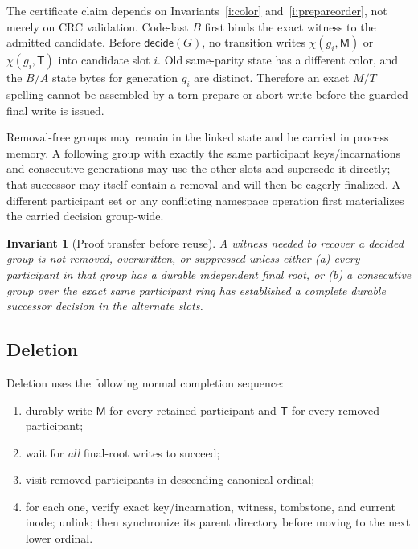 \documentclass[10pt,twocolumn]{article}
\newtheorem{invariant}{Invariant}
\theoremstyle{remark}
\newcommand{\Materialized}{\mathsf{M}}
\newcommand{\Tombstone}{\mathsf{T}}
\begin{document}
The certificate claim depends on Invariants~\ref{i:color} and~\ref{i:prepareorder}, not merely on
CRC validation. Code-last $B$ first binds the exact witness to the admitted candidate. Before
$\mathsf{decide}(G)$, no transition writes $\chi(g_i,\Materialized)$ or
$\chi(g_i,\Tombstone)$ into candidate slot $i$. Old same-parity state has a different color, and
the $B/A$ state bytes for generation $g_i$ are distinct. Therefore an exact $M/T$ spelling cannot
be assembled by a torn prepare or abort write before the guarded final write is issued.

Removal-free groups may remain in the linked state and be carried in process memory. A following
group with exactly the same participant keys/incarnations and consecutive generations may use the
other slots and supersede it directly; that successor may itself contain a removal and will then be
eagerly finalized. A different participant set or any conflicting namespace operation first
materializes the carried decision group-wide.

\begin{invariant}[Proof transfer before reuse]\label{i:reuse}
A witness needed to recover a decided group is not removed, overwritten, or suppressed unless
either (a) \emph{every} participant in that group has a durable independent final root, or (b) a
consecutive group over the exact same participant ring has established a complete durable successor
decision in the alternate slots.
\end{invariant}

\subsection{Deletion}

Deletion uses the following normal completion sequence:
\begin{enumerate}
  \item durably write $\Materialized$ for every retained participant and $\Tombstone$ for every
  removed participant;
  \item wait for \emph{all} final-root writes to succeed;
  \item visit removed participants in descending canonical ordinal;
  \item for each one, verify exact key/incarnation, witness, tombstone, and current inode; unlink;
  then synchronize its parent directory before moving to the next lower ordinal.
\end{enumerate}
\end{document}
